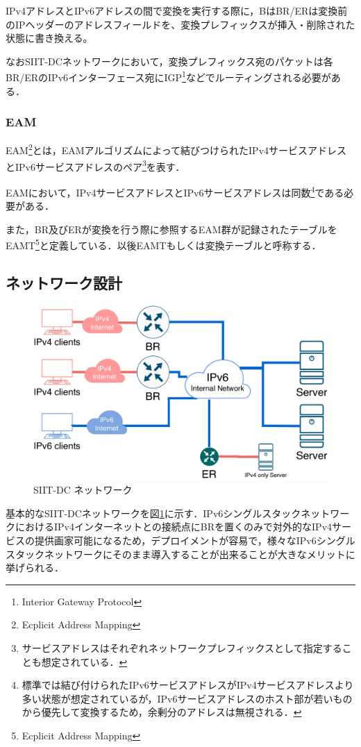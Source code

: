 IPv4アドレスとIPv6アドレスの間で変換を実行する際に，BはBR/ERは変換前のIPヘッダーのアドレスフィールドを、変換プレフィックスが挿入・削除された状態に書き換える。

なおSIIT-DCネットワークにおいて，変換プレフィックス宛のパケットは各BR/ERのIPv6インターフェース宛にIGP\footnote{Interior Gateway Protocol}などでルーティングされる必要がある．

\subsubsection{EAM}
EAM\footnote{Ecplicit Address Mapping}とは，EAMアルゴリズム\cite{RFC7757}によって結びつけられたIPv4サービスアドレスとIPv6サービスアドレスのペア\footnote{サービスアドレスはそれぞれネットワークプレフィックスとして指定することも想定されている．}を表す．

EAMにおいて，IPv4サービスアドレスとIPv6サービスアドレスは同数\footnote{標準では結び付けられたIPv6サービスアドレスがIPv4サービスアドレスより多い状態が想定されているが，IPv6サービスアドレスのホスト部が若いものから優先して変換するため，余剰分のアドレスは無視される．}である必要がある．

また，BR及びERが変換を行う際に参照するEAM群が記録されたテーブルをEAMT\footnote{Ecplicit Address Mapping}と定義している．以後EAMTもしくは変換テーブルと呼称する．



\subsection{ネットワーク設計}
\label{issue:siit-dc:network}
\begin{figure}[h]
    \begin{center}
      \includegraphics[width=12cm,pagebox=cropbox,clip]{img/siit-dc-network.pdf}
    \end{center}
    \caption{SIIT-DC ネットワーク}
    \label{fig:siit-dc_network}
\end{figure}
基本的なSIIT-DCネットワークを図\ref{fig:siit-dc_network}に示す．IPv6シングルスタックネットワークにおけるIPv4インターネットとの接続点にBRを置くのみで対外的なIPv4サービスの提供画家可能になるため，デプロイメントが容易で，様々なIPv6シングルスタックネットワークにそのまま導入することが出来ることが大きなメリットに挙げられる．

